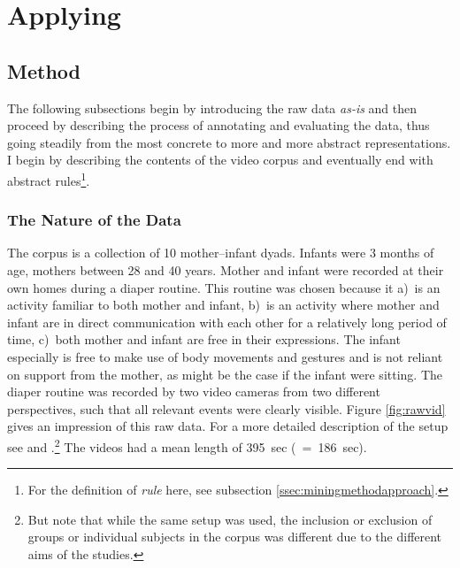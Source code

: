 
\chapter{Applying \fpmupper}
\label{ch:mining}

\section{Method}
\label{sec:miningmethod}
The following subsections begin by introducing the raw data \emph{as-is} and then proceed by describing the process of annotating and evaluating the data, thus going steadily from the most concrete to more and more abstract representations.
I begin by describing the contents of the video corpus and eventually end with abstract rules\footnote{For the definition of \emph{rule} here, see subsection \ref{ssec:miningmethodapproach}.}.

\subsection{The Nature of the Data}
\label{ssec:miningmethodnature}
The corpus is a collection of 10 mother--infant dyads.
Infants were 3 months of age, mothers between 28 and 40 years.
Mother and infant were recorded at their own homes during a diaper routine.
This routine was chosen because it a)~is an activity familiar to both mother and infant, b)~is an activity where mother and infant are in direct communication with each other for a relatively long period of time, c)~both mother and infant are free in their expressions.
The infant especially is free to make use of body movements and gestures and is not reliant on support from the mother, as might be the case if the infant were sitting.
The diaper routine was recorded by two video cameras from two different perspectives, such that all relevant events were clearly visible.
Figure \ref{fig:rawvid} gives an impression of this raw data.
For a more detailed description of the setup see \citet[]{nomikou_verbs_2017} and \citet[]{nomikou_language_2011}.\footnote{But note that while the same setup was used, the inclusion or exclusion of groups or individual subjects in the corpus was different due to the different aims of the studies.} The videos had a mean length of 395~sec (\sd~=~186~sec).



